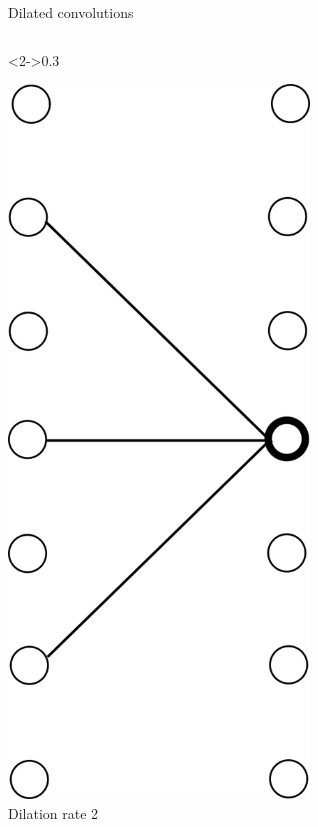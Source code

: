 \documentclass[xcolor=pdftex,dvipsnames,table,mathserif]{beamer}
\begin{document}
\begin{frame}{Dilated convolutions}
\begin{columns}
    \begin{column}<2->{0.3\textwidth}
      \begin{center}
        \includegraphics[width=0.60\textwidth]{dil_conv2.png}
        \\ \scriptsize{Dilation rate 2}
      \end{center}
    \end{column}


\end{columns}
\end{frame}
\end{document}
